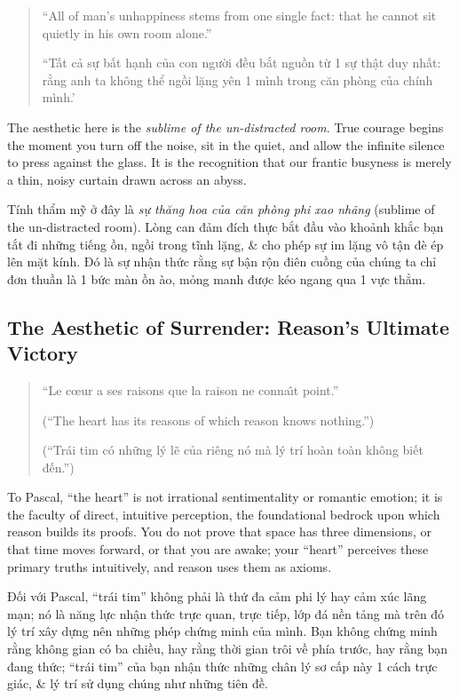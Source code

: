 \documentclass[11pt]{article}
\begin{document}
\begin{quote}
``All of man's unhappiness stems from one single fact: that he cannot sit quietly in his own room alone.''

``Tất cả sự bất hạnh của con người đều bắt nguồn từ 1 sự thật duy nhất: rằng anh ta không thể ngồi lặng yên 1 mình trong căn phòng của chính mình.'\
\end{quote}

The aesthetic here is the \emph{sublime of the un-distracted room}. True courage begins the moment you turn off the noise, sit in the quiet, and allow the infinite silence to press against the glass. It is the recognition that our frantic busyness is merely a thin, noisy curtain drawn across an abyss.

Tính thẩm mỹ ở đây là \emph{sự thăng hoa của căn phòng phi xao nhãng} (sublime of the un-distracted room). Lòng can đảm đích thực bắt đầu vào khoảnh khắc bạn tắt đi những tiếng ồn, ngồi trong tĩnh lặng, \& cho phép sự im lặng vô tận đè ép lên mặt kính. Đó là sự nhận thức rằng sự bận rộn điên cuồng của chúng ta chỉ đơn thuần là 1 bức màn ồn ào, mỏng manh được kéo ngang qua 1 vực thẳm.

\subsection{The Aesthetic of Surrender: Reason's Ultimate Victory}
\begin{quote}
``Le c\oe ur a ses raisons que la raison ne conna\^{\i}t point.''

(``The heart has its reasons of which reason knows nothing.'')

(``Trái tim có những lý lẽ của riêng nó mà lý trí hoàn toàn không biết đến.'')
\end{quote}

To Pascal, ``the heart'' is not irrational sentimentality or romantic emotion; it is the faculty of direct, intuitive perception, the foundational bedrock upon which reason builds its proofs. You do not prove that space has three dimensions, or that time moves forward, or that you are awake; your ``heart'' perceives these primary truths intuitively, and reason uses them as axioms.

Đối với Pascal, ``trái tim'' không phải là thứ đa cảm phi lý hay cảm xúc lãng mạn; nó là năng lực nhận thức trực quan, trực tiếp, lớp đá nền tảng mà trên đó lý trí xây dựng nên những phép chứng minh của mình. Bạn không chứng minh rằng không gian có ba chiều, hay rằng thời gian trôi về phía trước, hay rằng bạn đang thức; ``trái tim'' của bạn nhận thức những chân lý sơ cấp này 1 cách trực giác, \& lý trí sử dụng chúng như những tiên đề.
\end{document}
